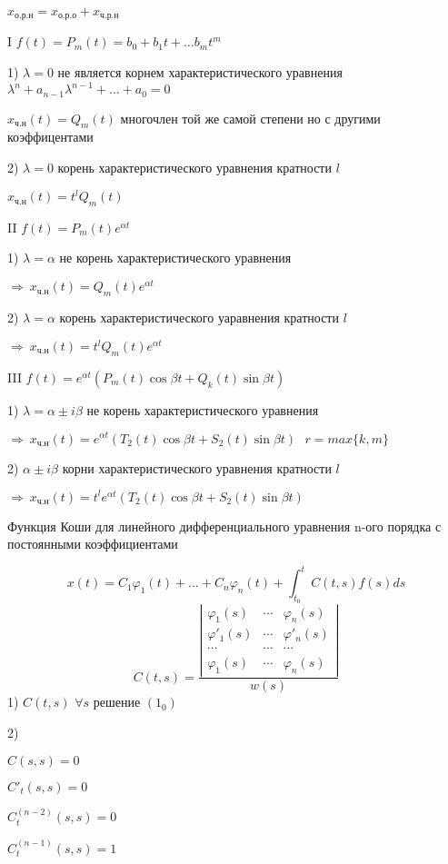 \begin{theorem}
  $x_{\text{о.р.н}} = x_{\text{о.р.о}} + x_{\text{ч.р.н}}$

  I $f(t) = P_m(t) = b_0 + b_1 t + \ldots b_m t^m$

  1) $\lambda = 0$ не является корнем характеристического уравнения
  $\lambda^n + a_{n-1} \lambda^{n-1} + \ldots + a_0 = 0$

  $x_{\text{ч.н}}(t) = Q_m(t)$ многочлен той же самой степени но с другими
  коэффицентами

  2) $\lambda = 0$ корень характеристического уравнения кратности $l$

  $x_{\text{ч.н}}(t) = t^l Q_m(t)$

  II $f(t) = P_m(t) e^{\alpha t}$

  1) $\lambda = \alpha$ не корень характеристического уравнения

  $\Rightarrow ~ x_{\text{ч.н}}(t) = Q_m(t) e^{\alpha t}$

  2) $\lambda = \alpha$ корень характеристического уаравнения кратности $l$

  $\Rightarrow ~ x_{\text{ч.н}}(t) = t^l Q_m(t) e^{\alpha t}$

  III $f(t) = e^{\alpha t} (P_m(t) \cos \beta t + Q_k(t) \sin \beta t)$

  1) $\lambda = \alpha \pm i\beta$ не корень характеристического уравнения

  $\Rightarrow ~ x_{\text{ч.н}}(t) = e^{\alpha t}(T_2(t) \cos \beta t + S_2(t)
  \sin \beta t) ~~~ r = max\{ k,m \}$

  2) $\alpha \pm i\beta$ корни характеристического уравнения кратности $l$

  $\Rightarrow ~ x_{\text{ч.н}}(t) = t^l e^{\alpha t}(T_2(t) \cos \beta t +
  S_2(t) \sin \beta t)$
\end{theorem}

\begin{title}[\Large]
  Функция Коши для линейного дифференциального уравнения n-ого порядка с
  постоянными коэффициентами
\end{title}

\begin{define}
  $$
  x(t) = C_1\varphi_1(t) + \ldots + C_n\varphi_n(t) + \int_{t_0}^t C(t,s)f(s)ds
  $$
  $$
  C(t,s) = \frac{
    \left|
    \begin{array}{ccc}
      \varphi_1(s) & \cdots & \varphi_n(s) \\
      \varphi'_1(s) & \cdots & \varphi'_n(s) \\
      \cdots & \cdots & \cdots \\
      \varphi_1(s) & \cdots & \varphi_n(s)
    \end{array}
    \right|
  }{w(s)}
  $$
  1) $C(t,s)$ $\forall s$ решение $(1_0)$

  2)

  $C(s,s) = 0$

  $C'_t(s,s) = 0$

  $C_t^{(n-2)}(s,s) = 0$

  $C_t^{(n-1)}(s,s) = 1$
\end{define}

